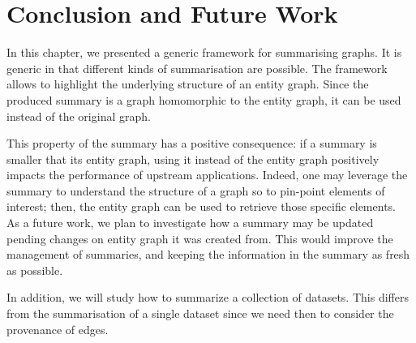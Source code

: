 \section{Conclusion and Future Work}

In this chapter, we presented a generic framework for summarising graphs. It is generic in that different kinds of summarisation are possible. The framework allows to highlight the underlying structure of an entity graph. Since the produced summary is a graph homomorphic to the entity graph, it can be used instead of the original graph.

This property of the summary has a positive consequence: if a summary is smaller that its entity graph, using it instead of the entity graph positively impacts the performance of upstream applications. Indeed, one may leverage the summary to understand the structure of a graph so to pin-point elements of interest; then, the entity graph can be used to retrieve those specific elements.\\

As a future work, we plan to investigate how a summary may be updated pending changes on entity graph it was created from. This would improve the management of summaries, and keeping the information in the summary as fresh as possible.

In addition, we will study how to summarize a collection of datasets. This differs from the summarisation of a single dataset since we need then to consider the provenance of edges.
